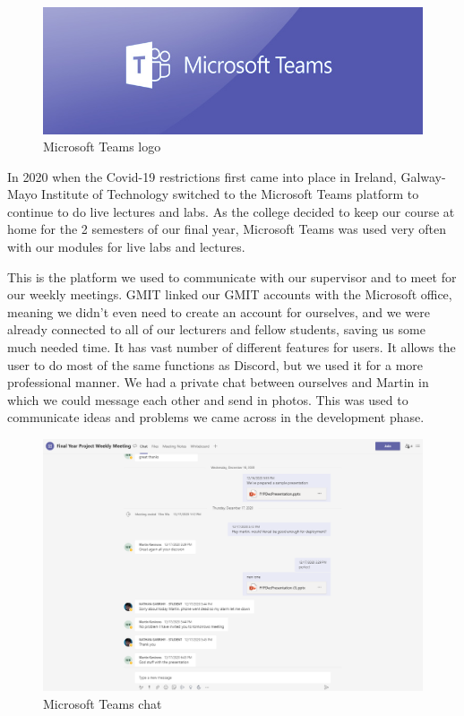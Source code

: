 \begin{figure}[hb]
\renewcommand\thefigure{3.20}
\centering
\includegraphics[scale=0.4]{img/teams-728.jpg}
\caption{Microsoft Teams logo}
\label{TeamsLogo}
\end{figure}

In 2020 when the Covid-19 restrictions first came into place in Ireland, Galway-Mayo Institute of Technology switched to the Microsoft Teams platform to continue to do live lectures and labs. As the college decided to keep our course at home for the 2 semesters of our final year, Microsoft Teams was used very often with our modules for live labs and lectures. \par
This is the platform we used to communicate with our supervisor and to meet for our weekly meetings. GMIT linked our GMIT accounts with the Microsoft office, meaning we didn't even need to create an account for ourselves, and we were already connected to all of our lecturers and fellow students, saving us some much needed time. It has vast number of different features for users. It allows the user to do most of the same functions as Discord, but we used it for a more professional manner. We had a private chat between ourselves and Martin in which we could message each other and send in photos. This was used to communicate ideas and problems we came across in the development phase. \par

\begin{figure}[ht]
\renewcommand\thefigure{3.21}
\centering
\includegraphics[scale=0.4]{img/teams.PNG}
\caption{Microsoft Teams chat}
\label{TeamsChat}
\end{figure}

